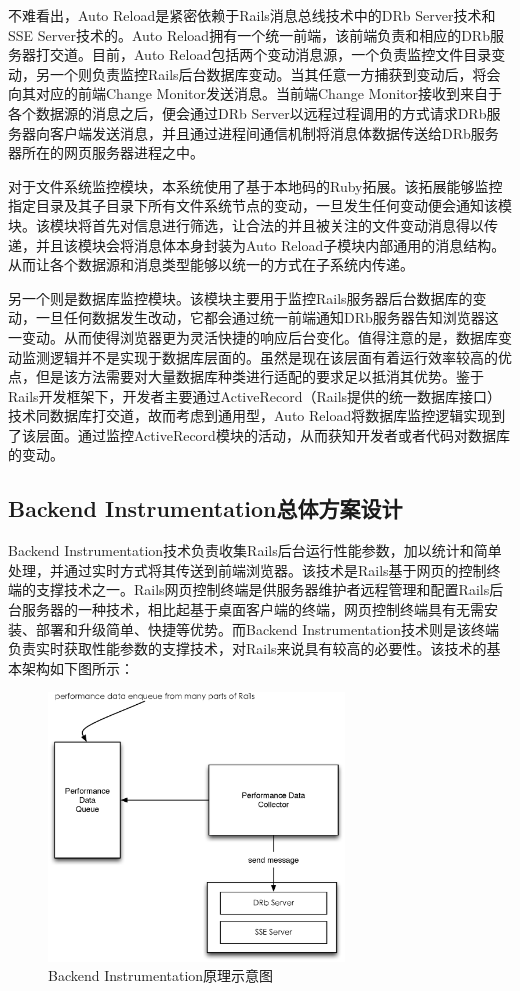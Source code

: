 不难看出，Auto Reload是紧密依赖于Rails消息总线技术中的DRb Server技术和SSE Server技术的。Auto Reload拥有一个统一前端，该前端负责和相应的DRb服务器打交道。目前，Auto Reload包括两个变动消息源，一个负责监控文件目录变动，另一个则负责监控Rails后台数据库变动。当其任意一方捕获到变动后，将会向其对应的前端Change Monitor发送消息。当前端Change Monitor接收到来自于各个数据源的消息之后，便会通过DRb Server以远程过程调用的方式请求DRb服务器向客户端发送消息，并且通过进程间通信机制将消息体数据传送给DRb服务器所在的网页服务器进程之中。

对于文件系统监控模块，本系统使用了基于本地码的Ruby拓展。该拓展能够监控指定目录及其子目录下所有文件系统节点的变动，一旦发生任何变动便会通知该模块。该模块将首先对信息进行筛选，让合法的并且被关注的文件变动消息得以传递，并且该模块会将消息体本身封装为Auto Reload子模块内部通用的消息结构。从而让各个数据源和消息类型能够以统一的方式在子系统内传递。

另一个则是数据库监控模块。该模块主要用于监控Rails服务器后台数据库的变动，一旦任何数据发生改动，它都会通过统一前端通知DRb服务器告知浏览器这一变动。从而使得浏览器更为灵活快捷的响应后台变化。值得注意的是，数据库变动监测逻辑并不是实现于数据库层面的。虽然是现在该层面有着运行效率较高的优点，但是该方法需要对大量数据库种类进行适配的要求足以抵消其优势。鉴于Rails开发框架下，开发者主要通过ActiveRecord（Rails提供的统一数据库接口）技术同数据库打交道，故而考虑到通用型，Auto Reload将数据库监控逻辑实现到了该层面。通过监控ActiveRecord模块的活动，从而获知开发者或者代码对数据库的变动。

\subsection{Backend Instrumentation总体方案设计}
Backend Instrumentation技术负责收集Rails后台运行性能参数，加以统计和简单处理，并通过实时方式将其传送到前端浏览器。该技术是Rails基于网页的控制终端的支撑技术之一。Rails网页控制终端是供服务器维护者远程管理和配置Rails后台服务器的一种技术，相比起基于桌面客户端的终端，网页控制终端具有无需安装、部署和升级简单、快捷等优势。而Backend Instrumentation技术则是该终端负责实时获取性能参数的支撑技术，对Rails来说具有较高的必要性。该技术的基本架构如下图所示：

\begin{figure}[h]
\centering
\includegraphics[width=0.7\textwidth]{images/overview/backend_instrumentation.eps}
\caption{Backend Instrumentation原理示意图}
\label{fig-back-instrumentaion}
\end{figure}

